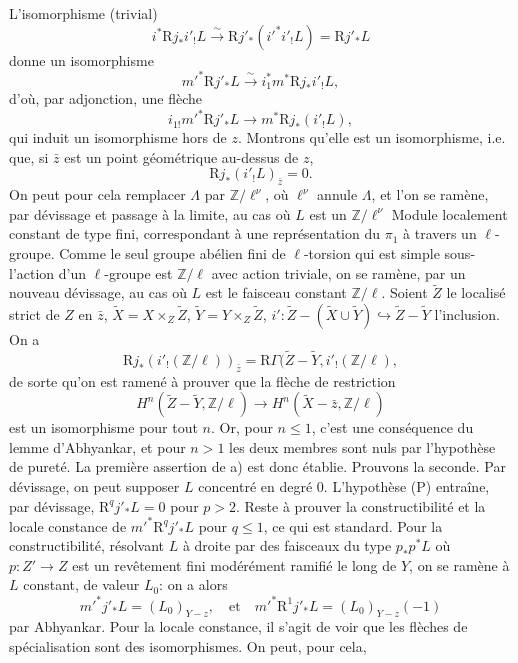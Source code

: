 L'isomorphisme (trivial)
\[
i^*\mathrm{R} j_*i'_!L\xrightarrow{\sim}\mathrm{R} j'_*(i'^*i'_!L)=\mathrm{R} j'_*L
\]
donne un
isomorphisme
\[
m'^*\mathrm{R} j'_*L\xrightarrow{\sim} i_1^*m^*\mathrm{R} j_*i'_!L,
\]
d'où, par adjonction, une flèche
\[
i_{1!}m'^*\mathrm{R} j'_*L\longrightarrow m^*\mathrm{R} j_*(i'_!L),
\]
qui induit un isomorphisme hors de $z$. Montrons qu'elle est un isomorphisme, i.e. que, si $\bar z$ est un point géométrique au-dessus de $z$,
\[
\mathrm{R} j_*(i'_!L)_{\bar z}=0.
\]
On peut pour cela remplacer $\Lambda$ par $\mathbb{Z}/\ell^\nu$, où $\ell^\nu$ annule $\Lambda$, et l'on se ramène, par dévissage et passage à la limite, au cas où $L$ est un $\mathbb{Z}/\ell^\nu$ Module localement constant de type fini, correspondant à une représentation du $\pi_1$ à travers un $\ell$-groupe. Comme le seul groupe abélien fini de $\ell$-torsion qui est simple sous-l'action d'un $\ell$-groupe est $\mathbb{Z}/\ell$ avec action triviale, on se ramène, par un nouveau dévissage, au cas où $L$ est le faisceau constant $\mathbb{Z}/\ell$. Soient $\widetilde Z$ le localisé strict de $Z$ en $\bar z$, $\widetilde X=X\times_Z\widetilde Z$, $\widetilde Y=Y\times_Z\widetilde Z$, $i':\widetilde Z-(\widetilde X\cup\widetilde Y)\hookrightarrow \widetilde Z-\widetilde Y$ l'inclusion. On a
\[
\mathrm{R} j_*(i'_!(\mathbb{Z}/\ell))_{\bar z}
=\mathrm{R}\Gamma(\widetilde Z-\widetilde Y,i'_!(\mathbb{Z}/\ell),
\]
de sorte qu'on est ramené à prouver que la flèche de restriction
\[
H^n(\widetilde Z-\widetilde Y,\mathbb{Z}/\ell)
\longrightarrow
H^n(\widetilde X-\bar z,\mathbb{Z}/\ell)
\]
est un isomorphisme pour tout $n$. Or, pour $n\le1$, c'est une conséquence du lemme d'Abhyankar, et pour $n>1$ les deux membres sont nuls par l'hypothèse de pureté. La première assertion de a) est donc établie. Prouvons la seconde. Par dévissage, on peut supposer $L$ concentré en degré $0$. L'hypothèse (P) entraîne, par dévissage, $\mathrm{R}^qj'_*L=0$ pour $p>2$. Reste à prouver la constructibilité et la locale constance de $m'^*\mathrm{R}^qj'_*L$ pour $q\le1$, ce qui est standard. Pour la constructibilité, résolvant $L$ à droite par des faisceaux du type $p_*p^*L$ où $p:Z'\to Z$ est un revêtement fini modérément ramifié le long de $Y$, on se ramène à $L$ constant, de valeur $L_0$: on a alors
\[
m'^*j'_*L=(L_0)_{Y-z},
\quad\text{et}\quad
m'^*\mathrm{R}^1j'_*L=(L_0)_{Y-z}(-1)
\]
par Abhyankar. Pour la locale constance, il s'agit de voir que les flèches de spécialisation sont des isomorphismes. On peut, pour cela,
